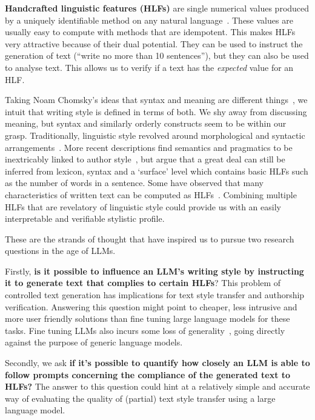 \documentclass[11pt]{article}
\begin{document}
\textbf{Handcrafted linguistic features (HLFs)} are single numerical values
produced by a uniquely identifiable method on any natural
language~\cite{lftk-2023}.
These values are usually easy to compute with methods that are idempotent.
This makes HLFs very attractive because of their dual potential.
They can be used to instruct the generation of text (``write no more than 10
sentences''), but they can also be used to analyse text.
This allows us to verify if a text has the \textit{expected} value for an HLF.\@

Taking Noam Chomsky's ideas that syntax and meaning are different
things~\cite{chomsky2002syntactic}, we intuit that writing style is defined in
terms of both.
We shy away from discussing meaning, but syntax and similarly orderly constructs
seem to be within our grasp.
Traditionally, linguistic style revolved around morphological and syntactic
arrangements~\cite{lugea2023stylistics}.
More recent descriptions find semantics and pragmatics to be inextricably linked
to author style~\cite{verma2019lexical}, but argue that a great deal can still
be inferred from lexicon, syntax and a `surface' level which contains basic HLFs
such as the number of words in a sentence.
Some have observed that many characteristics of written text can be computed as
HLFs~\cite{hovy1987generating,lugea2023stylistics}.
Combining multiple HLFs that are revelatory of linguistic style could provide us
with an easily interpretable and verifiable stylistic profile.

These are the strands of thought that have inspired us to pursue two research
questions in the age of LLMs.

Firstly, \textbf{is it possible to influence an LLM's writing style by
    instructing it to generate text that complies to certain HLFs}?
This problem of controlled text generation has implications for text style
transfer and authorship verification.
Answering this question might point to cheaper, less intrusive and more user
friendly solutions than fine tuning large language models for these tasks.
Fine tuning LLMs also incurs some loss of generality~\cite{yang2024unveiling},
going directly against the purpose of generic language models.

Secondly, we ask \textbf{if it's possible to quantify how closely an LLM is able
    to follow prompts concerning the compliance of the generated text to HLFs?}
The answer to this question could hint at a relatively simple and accurate way
of evaluating the quality of (partial) text style transfer using a large
language model.
\end{document}
